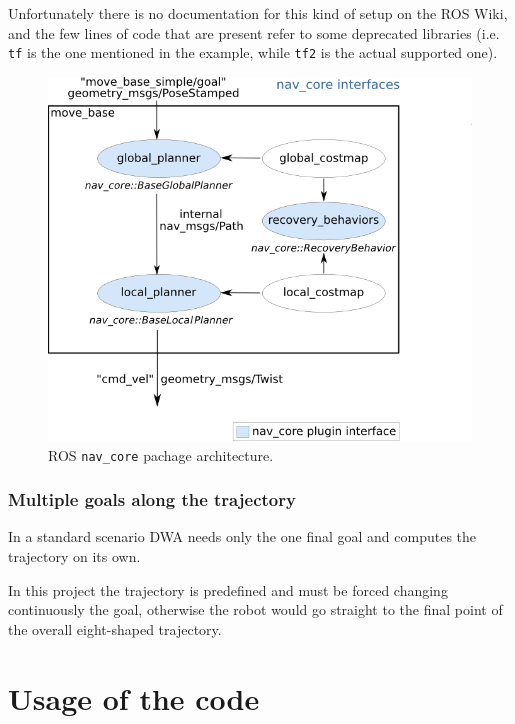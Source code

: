 \documentclass[11pt,a4paper]{article}
\begin{document}
Unfortunately there is no documentation for this kind of setup on the ROS Wiki, and the few lines of code that are present
refer to some deprecated libraries (i.e. \texttt{tf} is the one mentioned in the example, while \texttt{tf2} is the actual
supported one).

\begin{figure}[H]
    \centering
    \includegraphics[scale=0.4]{other/nav_core.png}
    \caption{ROS \texttt{nav\_core} pachage architecture.}
\end{figure}
\subsubsection{Multiple goals along the trajectory}

In a standard scenario DWA needs only the one final goal and computes the trajectory on its own.

In this project the trajectory is predefined and must be forced changing continuously the goal, otherwise the robot
would go straight to the final point of the overall eight-shaped trajectory.




\section{Usage of the code}
\end{document}
